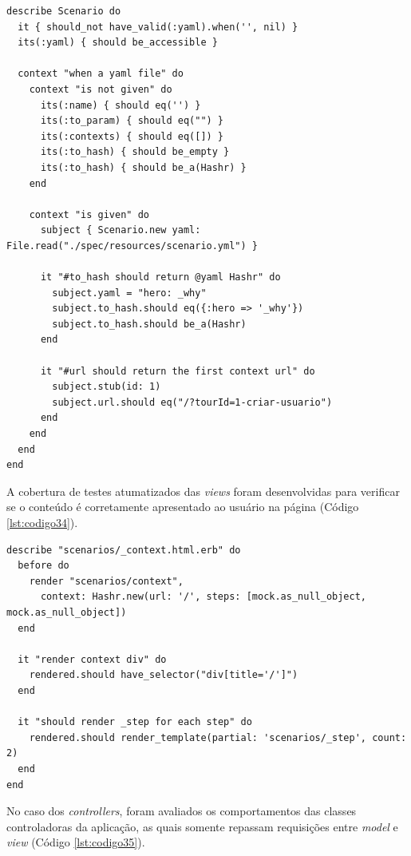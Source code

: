 {\singlespace
\begin{lstlisting}[caption=Teste unitário de \textit{model},label={lst:codigo33}]
describe Scenario do
  it { should_not have_valid(:yaml).when('', nil) }
  its(:yaml) { should be_accessible }

  context "when a yaml file" do
    context "is not given" do
      its(:name) { should eq('') }
      its(:to_param) { should eq("") }
      its(:contexts) { should eq([]) }
      its(:to_hash) { should be_empty }
      its(:to_hash) { should be_a(Hashr) }
    end

    context "is given" do
      subject { Scenario.new yaml: File.read("./spec/resources/scenario.yml") }

      it "#to_hash should return @yaml Hashr" do
        subject.yaml = "hero: _why"
        subject.to_hash.should eq({:hero => '_why'})
        subject.to_hash.should be_a(Hashr)
      end

      it "#url should return the first context url" do
        subject.stub(id: 1)
        subject.url.should eq("/?tourId=1-criar-usuario")
      end
    end
  end
end
\end{lstlisting}
}

A cobertura de testes atumatizados das \textit{views} foram desenvolvidas para verificar se o conteúdo é corretamente apresentado ao usuário na página (Código \ref{lst:codigo34}).

{\singlespace
\begin{lstlisting}[caption=Teste unitário de \textit{view},label={lst:codigo34}]
describe "scenarios/_context.html.erb" do
  before do
    render "scenarios/context",
      context: Hashr.new(url: '/', steps: [mock.as_null_object, mock.as_null_object])
  end

  it "render context div" do
    rendered.should have_selector("div[title='/']")
  end

  it "should render _step for each step" do
    rendered.should render_template(partial: 'scenarios/_step', count: 2)
  end
end
\end{lstlisting}
}

No caso dos \textit{controllers}, foram avaliados os comportamentos das classes controladoras da aplicação, as quais somente repassam requisições entre \textit{model} e \textit{view} (Código \ref{lst:codigo35}).


